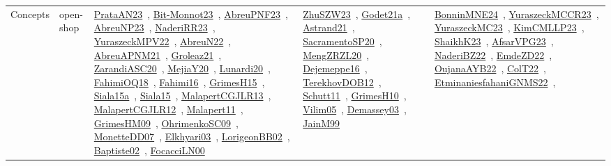 {\begin{longtable}{lp{3cm}>{\raggedright\arraybackslash}p{6cm}>{\raggedright\arraybackslash}p{6cm}>{\raggedright\arraybackslash}p{8cm}}
Concepts & open-shop & \href{../works/PrataAN23.pdf}{PrataAN23}~\cite{PrataAN23}, \href{../works/Bit-Monnot23.pdf}{Bit-Monnot23}~\cite{Bit-Monnot23}, \href{../works/AbreuPNF23.pdf}{AbreuPNF23}~\cite{AbreuPNF23}, \href{../works/AbreuNP23.pdf}{AbreuNP23}~\cite{AbreuNP23}, \href{../works/NaderiRR23.pdf}{NaderiRR23}~\cite{NaderiRR23}, \href{../works/YuraszeckMPV22.pdf}{YuraszeckMPV22}~\cite{YuraszeckMPV22}, \href{../works/AbreuN22.pdf}{AbreuN22}~\cite{AbreuN22}, \href{../works/AbreuAPNM21.pdf}{AbreuAPNM21}~\cite{AbreuAPNM21}, \href{../works/Groleaz21.pdf}{Groleaz21}~\cite{Groleaz21}, \href{../works/ZarandiASC20.pdf}{ZarandiASC20}~\cite{ZarandiASC20}, \href{../works/MejiaY20.pdf}{MejiaY20}~\cite{MejiaY20}, \href{../works/Lunardi20.pdf}{Lunardi20}~\cite{Lunardi20}, \href{../works/FahimiOQ18.pdf}{FahimiOQ18}~\cite{FahimiOQ18}, \href{../works/Fahimi16.pdf}{Fahimi16}~\cite{Fahimi16}, \href{../works/GrimesH15.pdf}{GrimesH15}~\cite{GrimesH15}, \href{../works/Siala15a.pdf}{Siala15a}~\cite{Siala15a}, \href{../works/Siala15.pdf}{Siala15}~\cite{Siala15}, \href{../works/MalapertCGJLR13.pdf}{MalapertCGJLR13}~\cite{MalapertCGJLR13}, \href{../works/MalapertCGJLR12.pdf}{MalapertCGJLR12}~\cite{MalapertCGJLR12}, \href{../works/Malapert11.pdf}{Malapert11}~\cite{Malapert11}, \href{../works/GrimesHM09.pdf}{GrimesHM09}~\cite{GrimesHM09}, \href{../works/OhrimenkoSC09.pdf}{OhrimenkoSC09}~\cite{OhrimenkoSC09}, \href{../works/MonetteDD07.pdf}{MonetteDD07}~\cite{MonetteDD07}, \href{../works/Elkhyari03.pdf}{Elkhyari03}~\cite{Elkhyari03}, \href{../works/LorigeonBB02.pdf}{LorigeonBB02}~\cite{LorigeonBB02}, \href{../works/Baptiste02.pdf}{Baptiste02}~\cite{Baptiste02}, \href{../works/FocacciLN00.pdf}{FocacciLN00}~\cite{FocacciLN00} & \href{../works/ZhuSZW23.pdf}{ZhuSZW23}~\cite{ZhuSZW23}, \href{../works/Godet21a.pdf}{Godet21a}~\cite{Godet21a}, \href{../works/Astrand21.pdf}{Astrand21}~\cite{Astrand21}, \href{../works/SacramentoSP20.pdf}{SacramentoSP20}~\cite{SacramentoSP20}, \href{../works/MengZRZL20.pdf}{MengZRZL20}~\cite{MengZRZL20}, \href{../works/Dejemeppe16.pdf}{Dejemeppe16}~\cite{Dejemeppe16}, \href{../works/TerekhovDOB12.pdf}{TerekhovDOB12}~\cite{TerekhovDOB12}, \href{../works/Schutt11.pdf}{Schutt11}~\cite{Schutt11}, \href{../works/GrimesH10.pdf}{GrimesH10}~\cite{GrimesH10}, \href{../works/Vilim05.pdf}{Vilim05}~\cite{Vilim05}, \href{../works/Demassey03.pdf}{Demassey03}~\cite{Demassey03}, \href{../works/JainM99.pdf}{JainM99}~\cite{JainM99} & \href{../works/BonninMNE24.pdf}{BonninMNE24}~\cite{BonninMNE24}, \href{../works/YuraszeckMCCR23.pdf}{YuraszeckMCCR23}~\cite{YuraszeckMCCR23}, \href{../works/YuraszeckMC23.pdf}{YuraszeckMC23}~\cite{YuraszeckMC23}, \href{../works/KimCMLLP23.pdf}{KimCMLLP23}~\cite{KimCMLLP23}, \href{../works/ShaikhK23.pdf}{ShaikhK23}~\cite{ShaikhK23}, \href{../works/AfsarVPG23.pdf}{AfsarVPG23}~\cite{AfsarVPG23}, \href{../works/NaderiBZ22.pdf}{NaderiBZ22}~\cite{NaderiBZ22}, \href{../works/EmdeZD22.pdf}{EmdeZD22}~\cite{EmdeZD22}, \href{../works/OujanaAYB22.pdf}{OujanaAYB22}~\cite{OujanaAYB22}, \href{../works/ColT22.pdf}{ColT22}~\cite{ColT22}, \href{../works/EtminaniesfahaniGNMS22.pdf}{EtminaniesfahaniGNMS22}~\cite{EtminaniesfahaniGNMS22}, 
\end{longtable}}
